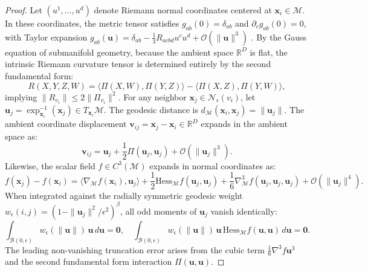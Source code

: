 \documentclass[11pt,a4paper]{article}
\theoremstyle{definition}
\begin{document}
\begin{proof}
Let $(u^1, \dots, u^d)$ denote Riemann normal coordinates centered at $\mathbf{x}_i \in \mathcal{M}$. 
In these coordinates, the metric tensor satisfies $g_{ab}(0) = \delta_{ab}$ and $\partial_c g_{ab}(0) = 0$, with Taylor expansion $g_{ab}(\mathbf{u}) = \delta_{ab} - \frac{1}{3} R_{acbd} u^c u^d + \mathcal{O}(\|\mathbf{u}\|^3)$ \cite{jost2008}.
By the Gauss equation of submanifold geometry, because the ambient space $\mathbb{R}^D$ is flat, the intrinsic Riemann curvature tensor is determined entirely by the second fundamental form:
\begin{equation}
R(X, Y, Z, W) = \langle \Pi(X, W), \Pi(Y, Z) \rangle - \langle \Pi(X, Z), \Pi(Y, W) \rangle,
\end{equation}
implying $\|R_{v_i}\| \le 2 \|\Pi_{v_i}\|^2$.
For any neighbor $\mathbf{x}_j \in \mathcal{N}_\epsilon(v_i)$, let $\mathbf{u}_j = \exp_{\mathbf{x}_i}^{-1}(\mathbf{x}_j) \in T_{\mathbf{x}_i}\mathcal{M}$. The geodesic distance is $d_{\mathcal{M}}(\mathbf{x}_i, \mathbf{x}_j) = \|\mathbf{u}_j\|$.
The ambient coordinate displacement $\mathbf{v}_{ij} = \mathbf{x}_j - \mathbf{x}_i \in \mathbb{R}^D$ expands in the ambient space as:
\begin{equation}
\mathbf{v}_{ij} = \mathbf{u}_j + \frac{1}{2} \Pi(\mathbf{u}_j, \mathbf{u}_j) + \mathcal{O}(\|\mathbf{u}_j\|^3).
\end{equation}
Likewise, the scalar field $f \in C^3(\mathcal{M})$ expands in normal coordinates as:
\begin{equation}
f(\mathbf{x}_j) - f(\mathbf{x}_i) = \langle \nabla_{\mathcal{M}} f(\mathbf{x}_i), \mathbf{u}_j \rangle + \frac{1}{2} \text{Hess}_{\mathcal{M}} f(\mathbf{u}_j, \mathbf{u}_j) + \frac{1}{6} \nabla_{\mathcal{M}}^3 f(\mathbf{u}_j, \mathbf{u}_j, \mathbf{u}_j) + \mathcal{O}(\|\mathbf{u}_j\|^4).
\end{equation}
When integrated against the radially symmetric geodesic weight $w_\epsilon(i, j) = (1 - \|\mathbf{u}_j\|^2/\epsilon^2)^\beta$, all odd moments of $\mathbf{u}_j$ vanish identically:
\begin{equation}
\int_{\mathcal{B}(0, \epsilon)} w_\epsilon(\|\mathbf{u}\|) \, \mathbf{u} \, d\mathbf{u} = \mathbf{0}, \quad \int_{\mathcal{B}(0, \epsilon)} w_\epsilon(\|\mathbf{u}\|) \, \mathbf{u} \, \text{Hess}_{\mathcal{M}} f(\mathbf{u}, \mathbf{u}) \, d\mathbf{u} = \mathbf{0}.
\end{equation}
The leading non-vanishing truncation error arises from the cubic term $\frac{1}{6} \nabla^3 f \mathbf{u}^3$ and the second fundamental form interaction $\Pi(\mathbf{u}, \mathbf{u})$.

\end{proof}
\end{document}
